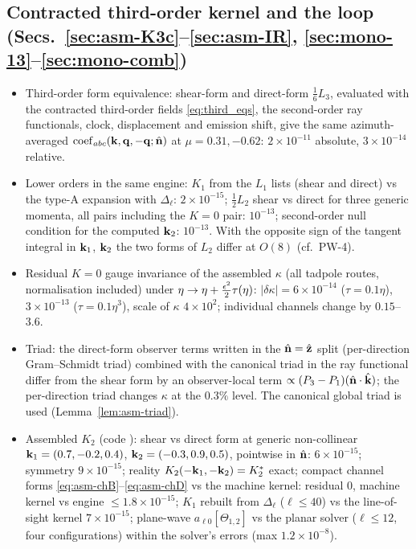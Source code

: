 \subsection*{Contracted third-order kernel and the loop (Secs.~\ref{sec:asm-K3c}--\ref{sec:asm-IR}, \ref{sec:mono-13}--\ref{sec:mono-comb})}
\begin{itemize}\itemsep1pt
\item[R-9] Third-order form equivalence: shear-form and direct-form $\tfrac16L_3$, evaluated with the contracted third-order fields \eqref{eq:third_eqs}, the
second-order ray functionals, clock, displacement and emission shift, give the same azimuth-averaged ${\rm coef}_{abc}(\mathbf k,\mathbf q,-\mathbf q;\hat{\mathbf n})$ at
$\mu=0.31,-0.62$: $2\times10^{-11}$ absolute, $3\times10^{-14}$ relative.
\item[R-10] Lower orders in the same engine: $K_1$ from the $L_1$ lists (shear and direct) vs the type-A expansion with $\Delta_\ell$: $2\times10^{-15}$;
$\tfrac12L_2$ shear vs direct for three generic momenta, all pairs including the $K=0$ pair: $10^{-13}$; second-order null condition for the computed
$\mathbf k_2$: $10^{-13}$.  With the opposite sign of the tangent integral in $\mathbf k_1$, $\mathbf k_2$ the two forms of $L_2$ differ at $O(8)$ (cf.\ PW-4).
\item[R-11] Residual $K=0$ gauge invariance of the assembled $\kappa$ (all tadpole routes, normalisation included) under $\eta\to\eta+\tfrac{\epsilon^2}2\tau(\eta)$:
$|\delta\kappa|=6\times10^{-14}$ ($\tau=0.1\eta$), $3\times10^{-13}$ ($\tau=0.1\eta^3$), scale of $\kappa$ $4\times10^2$; individual channels change by $0.15$--$3.6$.
\item[R-12] Triad: the direct-form observer terms written in the $\hat{\mathbf n}=\hat{\mathbf z}$ split (per-direction Gram--Schmidt triad) combined with the canonical
triad in the ray functional differ from the shear form by an observer-local term $\propto(P_3-P_1)(\hat{\mathbf n}\cdot\hat{\mathbf k})$; the per-direction triad changes $\kappa$
at the $0.3\%$ level.  The canonical global triad is used (Lemma~\ref{lem:asm-triad}).
\item[R-13] Assembled $K_2$ (code ): shear vs direct form at generic non-collinear $\mathbf k_1=(0.7,-0.2,0.4)$, $\mathbf k_2=(-0.3,0.9,0.5)$, pointwise in $\hat{\mathbf n}$: $6\times10^{-15}$; symmetry $9\times10^{-15}$; reality $K_2(-\mathbf k_1,-\mathbf k_2)=K_2^*$ exact; compact channel forms \eqref{eq:asm-chB}--\eqref{eq:asm-chD} vs the machine kernel: residual $0$, machine kernel vs engine $\le1.8\times10^{-15}$; $K_1$ rebuilt from $\Delta_\ell$ ($\ell\le40$) vs the line-of-sight kernel $7\times10^{-15}$; plane-wave $a_{\ell0}[\Theta_{1,2}]$ vs the planar solver ($\ell\le12$, four configurations) within the solver's errors (max $1.2\times10^{-8}$).

\end{itemize}
